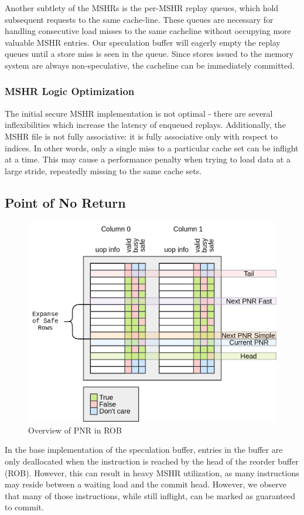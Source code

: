 Another subtlety of the MSHRs is the per-MSHR replay queues, which hold subsequent requests to the same cache-line. These queues are necessary for handling consecutive load misses to the same cacheline without occupying more valuable MSHR entries. Our speculation buffer will eagerly empty the replay queues until a store miss is seen in the queue. Since stores issued to the memory system are always non-speculative, the cacheline can be immediately committed.

\subsubsection{MSHR Logic Optimization}
The initial secure MSHR implementation is not optimal - there are several inflexibilities which increase the latency of enqueued replays. Additionally, the MSHR file is not fully associative: it is fully associative only with respect to indices. In other words, only a single miss to a particular cache set can be inflight at a time. This may cause a performance penalty when trying to load data at a large stride, repeatedly missing to the same cache sets.

\subsection{Point of No Return}
\begin{figure}
  \begin{center}\includegraphics[scale=0.17]{rob_pnr.png}\end{center}
  \caption{Overview of PNR in ROB}
  \label{PNR}
\end{figure}
In the base implementation of the speculation buffer, entries in the buffer are only deallocated when the instruction is reached by the head of the reorder buffer (ROB). However, this can result in heavy MSHR utilization, as many instructions may reside between a waiting load and the commit head. However, we observe that many of those instructions, while still inflight, can be marked as guaranteed to commit.

